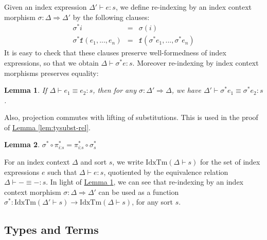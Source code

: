 \documentclass[natbib,preprint]{sigplanconf}
\newcommand{\indexOp}[1]{\texttt{#1}}
\newcommand{\idxTms}[2]{\mathrm{IdxTm}(#1 \vdash #2)}
\newtheorem{lemma}{Lemma}
\newcommand{\lemref}[1]{\hyperref[#1]{Lemma \ref*{#1}}}
\begin{document}
Given an index expression $\Delta' \vdash e : s$, we define
re-indexing by an index context morphism $\sigma : \Delta \Rightarrow
\Delta'$ by the following clauses:
\begin{eqnarray*}
  \sigma^*i & = & \sigma(i) \\
  \sigma^*\indexOp{f}(e_1, ..., e_n) & = & \indexOp{f}(\sigma^*e_1,...,\sigma^*e_n)
\end{eqnarray*}
It is easy to check that these clauses preserve well-formedness of
index expressions, so that we obtain $\Delta \vdash \sigma^*e :
s$. Moreover re-indexing by index context morphisms preserves
equality:
\begin{lemma}\label{lem:indexeq-subst}
  If $\Delta \vdash e_1 \equiv e_2 : s$, then for any $\sigma :
  \Delta' \Rightarrow \Delta$, we have $\Delta' \vdash \sigma^*e_1
  \equiv \sigma^*e_2 : s$.
\end{lemma}

Also, projection commutes with lifting of substitutions. This is used
in the proof of \lemref{lem:tysubst-rel}.
\begin{lemma}
  $\sigma^* \circ \pi^*_{i\mathord:s} = \pi^*_{i\mathord:s} \circ \sigma^*_s$
\end{lemma}

For an index context $\Delta$ and sort $s$, we write
$\idxTms{\Delta}{s}$ for the set of index expressions $e$ such that
$\Delta \vdash e : s$, quotiented by the equivalence relation $\Delta
\vdash - \equiv - : s$. In light of \lemref{lem:indexeq-subst}, we can
see that re-indexing by an index context morphism $\sigma : \Delta
\Rightarrow \Delta'$ can be used as a function $\sigma^* :
\idxTms{\Delta'}{s} \to \idxTms{\Delta}{s}$, for any sort $s$.

\subsection{Types and Terms}\label{sec:types-and-terms}
\end{document}
